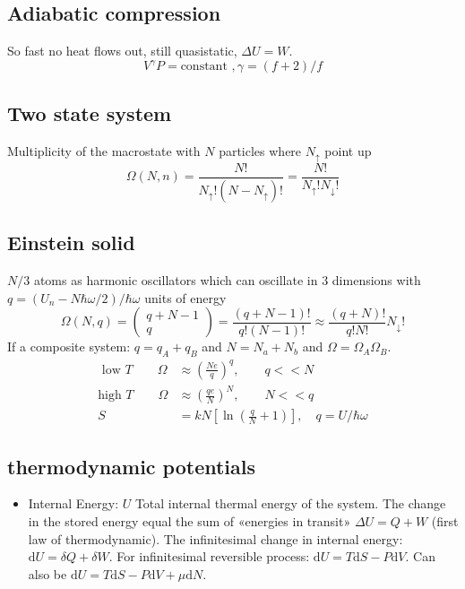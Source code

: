 \documentclass[a4paper, norsk, 8pt]{article}
\begin{document}
\begin{multicols*}{3}
\subsection*{\footnotesize  Adiabatic compression}
So fast no heat flows out, still quasistatic, $\Delta U = W$.
$$V^{\gamma}P = \text{constant }, \gamma = (f+2)/f$$

\subsection*{\footnotesize  Two state system}
Multiplicity of the macrostate with $N$ particles where $N_{\uparrow}$ point up
\begin{equation*}
  \Omega(N, n) = \frac{N!}{N_{\uparrow}! (N-N_{\uparrow})!} =  \frac{N!}{N_{\uparrow}! N_{\downarrow}!}
\end{equation*}

\subsection*{\footnotesize  Einstein solid}
$N/3$ atoms as harmonic oscillators which can oscillate in $3$ dimensions with $q=(U_n-N\hbar\omega/2)/\hbar\omega$ units of energy
\begin{equation*}
  \Omega(N, q) = \begin{pmatrix} q+N-1 \\ q \end{pmatrix} = \frac{(q+N-1)!}{q! (N-1)!} \approx  \frac{(q+N)!}{q! N!} N_{\downarrow}!
\end{equation*}
If a composite system: $q=q_A+q_B$ and $N=N_a+N_b$ and $\Omega = \Omega_A\Omega_B$.
\begin{align*}
  \text{ low $T$}\qquad \Omega &\approx \left(\frac{Ne}{q} \right)^q,  \qquad q << N\\
  \text{high $T$}\qquad \Omega &\approx \left(\frac{qe}{N} \right)^N,  \qquad N << q \\
  S &= kN\left[ \ln{\left( \frac{q}{N} + 1\right)} \right],\quad q = U/\hbar\omega
\end{align*}

\subsection*{\footnotesize  thermodynamic potentials}

\begin{itemize}
    \item Internal Energy: $U$    Total internal thermal energy of the system. The change in the stored energy equal the sum of «energies in transit»  $\Delta U = Q + W$ (first law of thermodynamic). The infinitesimal change in internal energy: $\mbox{d}U = \delta Q + \delta W$. For infinitesimal reversible process: $\mbox{d}U = T\mbox{d}S - P \mbox{d}V$.
    Can also be $\mbox{d}U = T\mbox{d}S -P\mbox{d}V + \mu\mbox{d}N$.\\


\end{itemize}
\end{multicols*}
\end{document}
